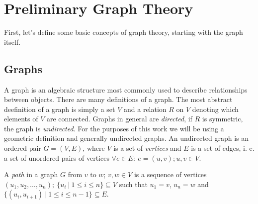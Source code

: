 \chapter{Preliminary Graph Theory}\label{ch:prelim}

First, let's define some basic concepts of graph theory, starting with the graph itself.

\section{Graphs}

\begin{definition}
    A graph is an algebraic structure most commonly used to describe relationships between objects. There are many definitions of a graph. The most abstract deefinition of a graph is simply a set $V$ and a relation $R$ on $V$ denoting which elements of $V$ are connected. Graphs in general are \textit{directed}, if $R$ is symmetric, the graph is \textit{undirected}. For the purposes of this work we will be using a geometric definition and generally undirected graphs. An undirected graph is an ordered pair $G = (V, E)$, where $V$ is a set of \textit{vertices} and $E$ is a set of edges, i. e. a set of unordered pairs of vertices $\forall e \in E: ~ e = (u,v); u,v \in V$.
\end{definition}

\begin{figure}[h]
    \centering
\end{figure}

\begin{definition}
    A \textit{path} in a graph $G$ from $v$ to $w$; $v,w \in V$ is a sequence of vertices $(u_1, u_2, \dots, u_n); ~ \{u_i ~|~ 1 \leq i \leq n\} \subseteq V$ such that $u_1 = v$, $u_n = w$ and $\{(u_i, u_{i+1}) ~|~ 1 \leq i \leq n-1\} \subseteq E$.
\end{definition}

